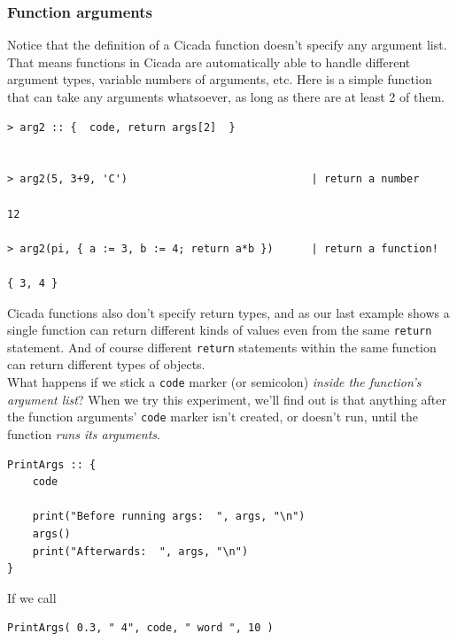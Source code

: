 \documentclass{article}
\newenvironment{code}{
       \begin{list}{}{
               \setlength{\leftmargin}{.4in}
               \setlength{\rightmargin}{0in}
               \setlength{\topsep}{.2in}
       }
       \small
       \item[] }
       { \end{list}   }
\begin{document}
\subsubsection{Function arguments} 

Notice that the definition of a Cicada function doesn't specify any argument list.  That means functions in Cicada are automatically able to handle different argument types, variable numbers of arguments, etc.  Here is a simple function that can take any arguments whatsoever, as long as there are at least 2 of them.

\begin{code} \begin{verbatim}
> arg2 :: {  code, return args[2]  }


> arg2(5, 3+9, 'C')                             | return a number

12

> arg2(pi, { a := 3, b := 4; return a*b })      | return a function! 

{ 3, 4 }
\end{verbatim} \end{code}

\noindent Cicada functions also don't specify return types, and as our last example shows a single function can return different kinds of values even from the same \verb#return# statement.  And of course different \verb#return# statements within the same function can return different types of objects.\\

What happens if we stick a \texttt{code} marker (or semicolon) \emph{inside the function's argument list}?  When we try this experiment, we'll find out is that anything after the function arguments' \verb#code# marker isn't created, or doesn't run, until the function \emph{runs its arguments}.

\begin{code} \begin{verbatim}
PrintArgs :: {
    code
    
    print("Before running args:  ", args, "\n")
    args()
    print("Afterwards:  ", args, "\n")
}
\end{verbatim} \end{code}

\noindent If we call

\begin{code} \begin{verbatim}
PrintArgs( 0.3, " 4", code, " word ", 10 )
\end{verbatim} \end{code}
\end{document}
